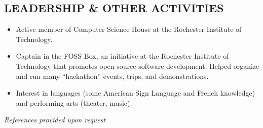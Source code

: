 \documentclass[line]{res}
\begin{document}
\begin{resume}
\section{LEADERSHIP \& OTHER ACTIVITIES}
	\begin{itemize}
	\item Active member of Computer Science House at the Rochester Institute of Technology.
	\item Captain in the FOSS Box, an initiative at the Rochester Institute of Technology that promotes open source software development.
          Helped organize and run many ``hackathon'' events, trips, and demonstrations.
	\item Interest in languages (some American Sign Language and French knowledge) and performing arts (theater, music).
	\end{itemize}

\begin{center}\vspace{-0.26in}\emph{References provided upon request\\[8pt]}\end{center}

\end{resume}
\end{document}
